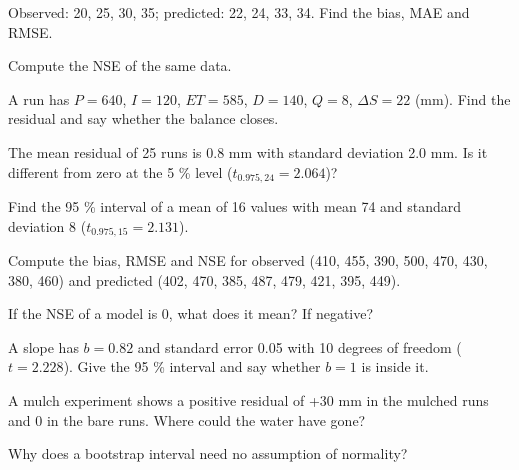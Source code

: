 \begin{exlist}
\item Observed: 20, 25, 30, 35; predicted: 22, 24, 33, 34. Find the bias, MAE and RMSE.
\item Compute the NSE of the same data.
\item A run has $P=640$, $I=120$, $ET=585$, $D=140$, $Q=8$, $\Delta S=22$ (mm). Find the residual and say whether the balance closes.
\item The mean residual of 25 runs is 0.8 mm with standard deviation 2.0 mm. Is it different from zero at the 5 \% level ($t_{0.975,24}=2.064$)?
\item Find the 95 \% interval of a mean of 16 values with mean 74 and standard deviation 8 ($t_{0.975,15}=2.131$).\exans{$[69.74,\ 78.26]$}
\item Compute the bias, RMSE and NSE for observed (410, 455, 390, 500, 470, 430, 380, 460) and predicted (402, 470, 385, 487, 479, 421, 395, 449).
\item If the NSE of a model is 0, what does it mean? If negative?
\item A slope has $b=0.82$ and standard error 0.05 with 10 degrees of freedom ($t=2.228$). Give the 95 \% interval and say whether $b=1$ is inside it.
\item A mulch experiment shows a positive residual of +30 mm in the mulched runs and 0 in the bare runs. Where could the water have gone?
\item Why does a bootstrap interval need no assumption of normality?
\end{exlist}
